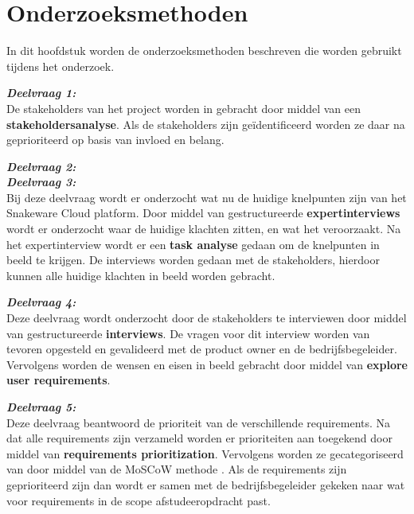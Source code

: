 \section{Onderzoeksmethoden}
In dit hoofdstuk worden de onderzoeksmethoden beschreven die worden gebruikt tijdens het onderzoek.

\whitespace[2]
\textit{\textbf{Deelvraag 1:} \SubquestionOne} \\
De stakeholders van het project worden in gebracht door middel van een \textbf{stakeholdersanalyse}.
Als de stakeholders zijn geïdentificeerd worden ze daar na geprioriteerd op basis van invloed en belang.

\whitespace[2]
\textit{\textbf{Deelvraag 2:} \SubquestionTwo} \\
%
%
\whitespace[2]
\textit{\textbf{Deelvraag 3:} \SubquestionThree} \\
Bij deze deelvraag wordt er onderzocht wat nu de huidige knelpunten zijn van het Snakeware Cloud platform.
Door middel van gestructureerde \textbf{expertinterviews} wordt er onderzocht waar de huidige klachten zitten, en wat het veroorzaakt.
Na het expertinterview wordt er een \textbf{task analyse} gedaan om de knelpunten in beeld te krijgen.
De interviews worden gedaan met de stakeholders, hierdoor kunnen alle huidige klachten in beeld worden gebracht.

\whitespace[2]
\textit{\textbf{Deelvraag 4:} \SubquestionFour} \\
Deze deelvraag wordt onderzocht door de stakeholders te interviewen door middel van gestructureerde \textbf{interviews}. 
De vragen voor dit interview worden van tevoren opgesteld en gevalideerd met de product owner en de bedrijfsbegeleider.
Vervolgens worden de wensen en eisen in beeld gebracht door middel van \textbf{explore user requirements}.

\whitespace[2]
\textit{\textbf{Deelvraag 5:} \SubquestionFive} \\
Deze deelvraag beantwoord de prioriteit van de verschillende requirements.
Na dat alle requirements zijn verzameld worden er prioriteiten aan toegekend door middel van \textbf{requirements prioritization}.
Vervolgens worden ze  gecategoriseerd van door middel van de MoSCoW methode \Parencite{MoSCoW}. 
Als de requirements zijn geprioriteerd zijn dan wordt er samen met de bedrijfsbegeleider gekeken naar wat voor requirements in de scope afstudeeropdracht past.
